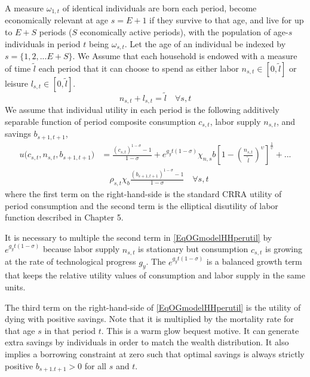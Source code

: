 \documentclass[letterpaper,12pt]{article}
\theoremstyle{definition}
\begin{document}
    A measure $\omega_{1,t}$ of identical individuals are born each period, become economically relevant at age $s=E+1$ if they survive to that age, and live for up to $E+S$ periods ($S$ economically active periods), with the population of age-$s$ individuals in period $t$ being $\omega_{s,t}$. Let the age of an individual be indexed by $s = \{1,2,...E+S\}$. We Assume that each household is endowed with a measure of time $\tilde{l}$ each period that it can choose to spend as either labor $n_{s,t}\in[0,\tilde{l}]$ or leisure $l_{s,t}\in[0,\tilde{l}]$.
    \begin{equation}\label{EqOGmodel_LabConstr}
      n_{s,t} + l_{s,t} = \tilde{l} \quad\forall s, t
    \end{equation}
    We assume that individual utility in each period is the following additively separable function of period composite consumption $c_{s,t}$, labor supply $n_{s,t}$, and savings $b_{s+1,t+1}$,
    \begin{equation}\label{EqOGmodelHHperutil}
      \begin{split}
        u\bigl(c_{s,t},n_{s,t},b_{s+1,t+1}\bigr) &= \frac{(c_{s,t})^{1-\sigma} - 1}{1-\sigma} + e^{g_y t(1-\sigma)}\chi_{n,s} b\left[1 - \left(\frac{n_{s,t}}{\tilde{l}}\right)^\upsilon\right]^\frac{1}{\upsilon} + ...\\
        &\quad \rho_{s,t}\chi_{b}\frac{(b_{s+1,t+1})^{1 - \sigma} - 1}{1 - \sigma} \quad\forall s,t
      \end{split}
    \end{equation}
    where the first term on the right-hand-side is the standard CRRA utility of period consumption and the second term is the elliptical disutility of labor function described in Chapter 5.

    It is necessary to multiple the second term in \eqref{EqOGmodelHHperutil} by $e^{g_y t(1-\sigma)}$ because labor supply $n_{s,t}$ is stationary but consumption $c_{s,t}$ is growing at the rate of technological progress $g_y$. The $e^{g_y t(1-\sigma)}$ is a balanced growth term that keeps the relative utility values of consumption and labor supply in the same units.

    The third term on the right-hand-side of \eqref{EqOGmodelHHperutil} is the utility of dying with positive savings. Note that it is multiplied by the mortality rate for that age $s$ in that period $t$. This is a warm glow bequest motive. It can generate extra savings by individuals in order to match the wealth distribution. It also implies a borrowing constraint at zero such that optimal savings is always strictly positive $b_{s+1.t+1}>0$ for all $s$ and $t$.
\end{document}
